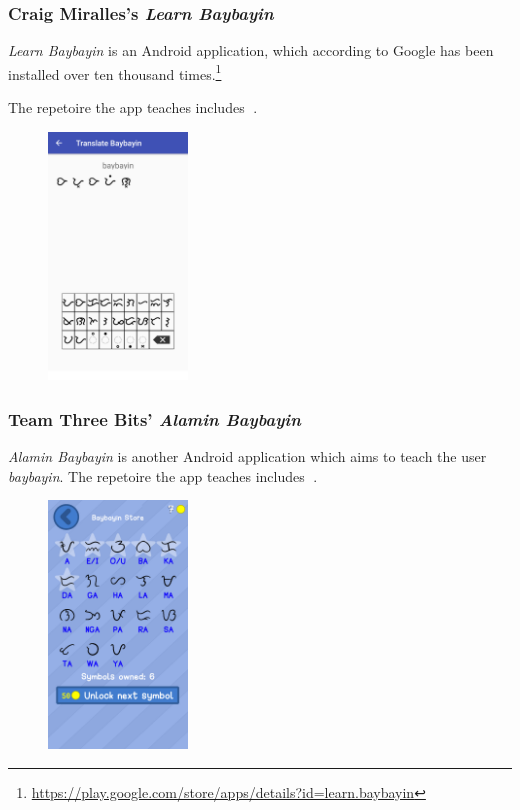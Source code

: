 \documentclass[a4paper,pagesize,openany,14pt,parskip=never]{scrbook}
\newcommand{\≈}{$\approx$}
\newcommand{\ra}{{\baybayin ᜍ}}
\begin{document}
\subsubsection{Craig Miralles's {\em Learn Baybayin}}

{\em Learn Baybayin} is an Android application, which according to Google has been installed over ten thousand times.\footnote{\url{https://play.google.com/store/apps/details?id=learn.baybayin}}

The repetoire the app teaches includes \ra.

\begin{figure}[H]
\includegraphics[width=0.33\textwidth]{LearnBaybayin}
\end{figure}

\subsubsection{Team Three Bits' {\em Alamin Baybayin}}

{\em Alamin Baybayin} is another Android application which aims to teach the user {\em baybayin}. The repetoire the app teaches includes \ra.

\begin{figure}[H]
\includegraphics[width=0.33\textwidth]{Alamin}
\end{figure}
\end{document}
